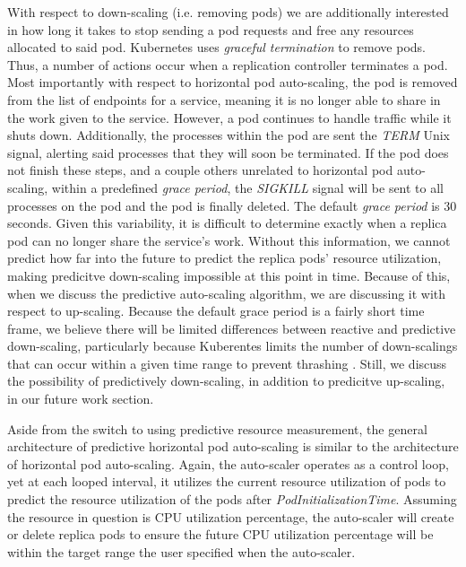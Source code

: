 With respect to down-scaling (i.e. removing pods) we are additionally
interested in how long it takes to stop sending a pod requests
and free any resources allocated to said
pod. Kubernetes uses \textit{graceful termination} to remove pods. Thus, a
number of actions occur when a replication controller terminates a pod. Most
importantly with respect to horizontal pod auto-scaling, the pod is removed from
the list of endpoints for a service, meaning it is no longer able to share in
the work given to the service. However, a pod continues to handle traffic while
it shuts down. Additionally, the processes within the pod are sent the
\textit{TERM} Unix signal, alerting said processes that they will soon be
terminated. If the pod does not finish these steps, and a couple others
unrelated to horizontal pod auto-scaling, within a predefined \textit{grace
period}, the \textit{SIGKILL} signal will be sent to all processes on the pod
and the pod is finally deleted. The default \textit{grace period} is 30
seconds.\cite{k8s-pods} Given this variability, it is difficult
to determine exactly when a replica pod can no longer share the service's work.
Without this information, we cannot predict how far into the future to predict
the replica pods' resource utilization, making predicitve down-scaling
impossible at this point in time. Because of
this, when we discuss the predictive auto-scaling algorithm, we are discussing it
with respect to up-scaling. Because the default grace period is a fairly short
time frame, we believe there will be limited differences between reactive and
predictive down-scaling, particularly because Kuberentes limits the number of
down-scalings that can occur within a given time range to prevent thrashing
\cite{k8s-horizontal-pod-autoscaler-proposal}. Still, we discuss the possibility
of predictively down-scaling, in addition to predicitve up-scaling, in our
future work section.

Aside from the switch to using predictive resource measurement, the
general architecture of predictive horizontal pod auto-scaling is similar to the
architecture of horizontal pod auto-scaling. Again, the auto-scaler operates as a
control loop, yet at each looped interval, it utilizes the current resource
utilization of pods to predict the resource utilization of the pods after
\textit{PodInitializationTime}. Assuming the resource in question is CPU
utilization percentage, the auto-scaler will create or delete replica pods
to ensure the future CPU utilization percentage will be within the target range
the user specified when the auto-scaler.
